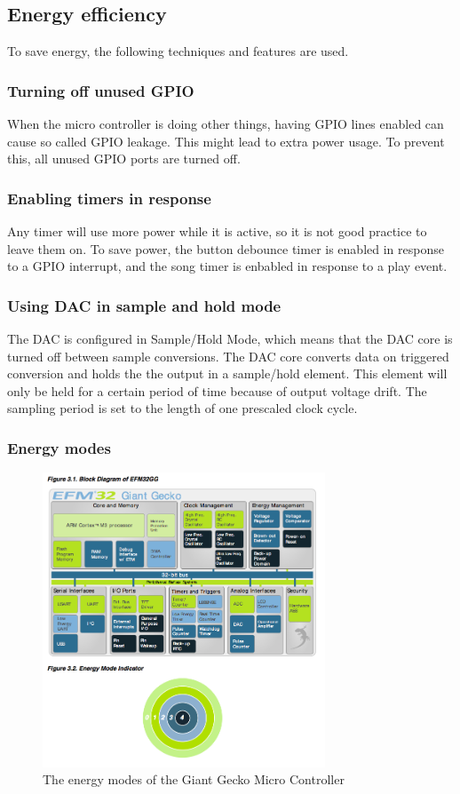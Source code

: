 \subsection{Energy efficiency}
To save energy, the following techniques and features are used.

\subsubsection{Turning off unused GPIO}
When the micro controller is doing other things, having GPIO lines enabled can cause so called GPIO leakage.
This might lead to extra power usage.
To prevent this, all unused GPIO ports are turned off.

\subsubsection{Enabling timers in response}
Any timer will use more power while it is active, so it is not good practice to leave them on.
To save power, the button debounce timer is enabled in response to a GPIO interrupt, and the song timer is enbabled in response to a play event. 

\subsubsection{Using DAC in sample and hold mode}
The DAC is configured in Sample/Hold Mode, which means that the DAC core is turned off between sample conversions.
The DAC core converts data on triggered conversion and holds the the output in a sample/hold element.
This element will only be held for a certain period of time because of output voltage drift.
The sampling period is set to the length of one prescaled clock cycle.

\subsubsection{Energy modes}
\begin{figure}[H]
\centering
\includegraphics[width=0.75\textwidth]{figures/energymodes.png}
\caption{The energy modes of the Giant Gecko Micro Controller}
\label{fig:energymodes}
\end{figure}

